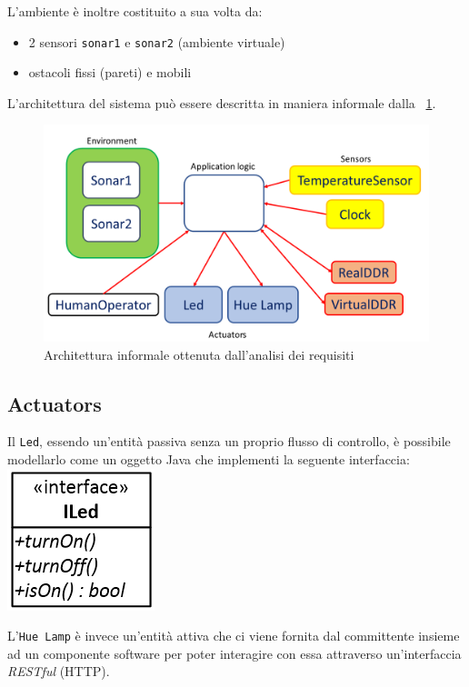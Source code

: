 \documentclass{../llncs}
\newcommand{\code}[1]{{\color{blue}\small{\texttt{#1}}}}
\newcommand{\labelfig}[1]{\label{fig:#1}}
\newcommand{\xf}[1]{\figurename~\ref{fig:#1}}
\begin{document}
L'ambiente è inoltre costituito a sua volta da:
\begin{itemize}[label={--}]
\item 2 sensori \code{sonar1} e \code{sonar2} (ambiente virtuale)
\item ostacoli fissi (pareti) e mobili
\end{itemize}

L'architettura del sistema può essere descritta in maniera informale dalla \xf{informalRA}.
\begin{figure}[!htb]
\centering
\includegraphics[scale=0.4]{img/informalReqAnalysis.png}
\caption{Architettura informale ottenuta dall'analisi dei requisiti}\labelfig{informalRA}
\end{figure}

\subsection{Actuators}
Il \texttt{Led}, essendo un'entità passiva senza un proprio flusso di controllo, è possibile modellarlo come un oggetto Java che implementi la seguente interfaccia:\\

\includegraphics[scale=0.4]{img/iled.png}

L'\texttt{Hue Lamp} è invece un'entità attiva che ci viene fornita dal committente insieme ad un componente software per poter interagire con essa attraverso un'interfaccia \textit{RESTful} (HTTP).
\end{document}
